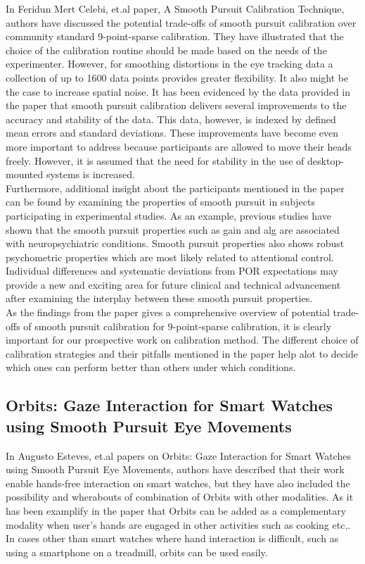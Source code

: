 In Feridun Mert Celebi, et.al \cite{17} paper, A Smooth Pursuit Calibration Technique, authors have discussed the potential trade-offs of smooth pursuit calibration over community standard 9-point-sparse calibration. They have illustrated that the choice of the calibration routine should be made based on the needs of the experimenter. However, for smoothing distortions in the eye tracking data a collection of up to 1600 data points provides greater flexibility. It also might be the case to increase spatial noise. It has been evidenced by the data provided in the paper that smooth pursuit calibration delivers several improvements to the accuracy and stability of the data. This data, however, is indexed by defined mean errors and standard deviations. These improvements have become even more important to address because participants are allowed to move their heads freely. However, it is assumed that the need for stability in the use of desktop-mounted systems is increased.\\

Furthermore, additional insight about the participants mentioned in the paper can be found by examining the properties of smooth pursuit in subjects participating in experimental studies. As an example, previous studies have shown that the smooth pursuit properties such as gain and alg are associated with neuropsychiatric conditions. Smooth pursuit properties also shows robust psychometric properties which are most likely related to attentional control. Individual differences and systematic deviations from POR expectations may provide a new and exciting area for future clinical and technical advancement after examining the interplay between these smooth pursuit properties.\\

As the findings from the paper gives a comprehensive overview of potential trade-offs of smooth pursuit calibration for 9-point-sparse calibration, it is clearly important for our prospective work on calibration method. The different choice of calibration strategies and their pitfalls mentioned in the paper help alot to decide which ones can perform better than others under which conditions.

\subsection{Orbits: Gaze Interaction for Smart Watches using Smooth Pursuit Eye Movements}

In Augusto Esteves, et.al \cite{18} \cite{19} papers on Orbits: Gaze Interaction for Smart Watches using Smooth Pursuit Eye Movements, authors have described that their work enable hands-free interaction on smart watches, but they have also included the possibility and wherabouts of combination of Orbits with other modalities. As it has been examplify in the paper that Orbits can be added as a complementary modality when user's hands are engaged in other activities such as cooking etc,. In cases other than smart watches where hand interaction is difficult, such as using a smartphone on a treadmill, orbits can be used easily.

